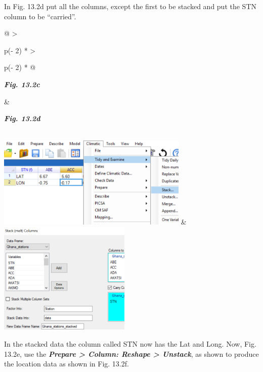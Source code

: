 \documentclass[
  letterpaper,
  DIV=11,
  numbers=noendperiod]{scrreprt}
\begin{document}
In Fig. 13.2d put all the columns, except the first to be stacked and
put the STN column to be ``carried''.

\begin{longtable}[]{@{}
  >{\raggedright\arraybackslash}p{(\columnwidth - 2\tabcolsep) * }
  >{\raggedright\arraybackslash}p{(\columnwidth - 2\tabcolsep) * }@{}}
\toprule\noalign{}
\begin{minipage}[b]{\linewidth}\raggedright
\textbf{\emph{Fig. 13.2c}}
\end{minipage} & \begin{minipage}[b]{\linewidth}\raggedright
\textbf{\emph{Fig. 13.2d}}
\end{minipage} \\
\midrule\noalign{}
\endhead
\bottomrule\noalign{}
\endlastfoot
\includegraphics[width=3.59348in,height=1.72939in]{figures/Fig13.2c.png}
&
\includegraphics[width=2.47702in,height=2.10991in]{figures/Fig13.2d.png} \\
\end{longtable}

In the stacked data the column called STN now has the Lat and Long. Now,
Fig. 13.2e, use the \textbf{\emph{Prepare \textgreater{} Column: Reshape
\textgreater{} Unstack}}, as shown to produce the location data as shown
in Fig. 13.2f.
\end{document}
